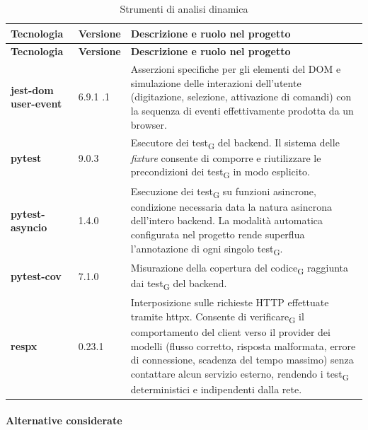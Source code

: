 \documentclass[a4paper, 10pt]{article}
\newenvironment{tabellatec}[2]{%
  \begingroup
  \small
  \setlength{\tabcolsep}{4pt}
  \begin{longtable}{|p{2.8cm}|p{1.5cm}|p{9.2cm}|}
    \caption{#1}\label{#2}\\
    \hline
    \textbf{Tecnologia} & \textbf{Versione} & \textbf{Descrizione e ruolo nel progetto} \\
    \hline
    \endfirsthead
    \hline
    \textbf{Tecnologia} & \textbf{Versione} & \textbf{Descrizione e ruolo nel progetto} \\
    \hline
    \endhead
}{%
  \end{longtable}
  \endgroup
}
\begin{document}
\begin{tabellatec}{Strumenti di analisi dinamica}{tab:tec-dinamica}
    \textbf{jest-dom \newline user-event} & 6.9.1 \newline 14.6.1 & Asserzioni specifiche per gli elementi del DOM e simulazione delle interazioni dell'utente (digitazione, selezione, attivazione di comandi) con la sequenza di eventi effettivamente prodotta da un browser. \\ \hline

    \textbf{pytest} & 9.0.3 & Esecutore dei test\textsubscript{G} del backend. Il sistema delle \textit{fixture} consente di comporre e riutilizzare le precondizioni dei test\textsubscript{G} in modo esplicito. \\ \hline

    \textbf{pytest-asyncio} & 1.4.0 & Esecuzione dei test\textsubscript{G} su funzioni asincrone, condizione necessaria data la natura asincrona dell'intero backend. La modalità automatica configurata nel progetto rende superflua l'annotazione di ogni singolo test\textsubscript{G}. \\ \hline

    \textbf{pytest-cov} & 7.1.0 & Misurazione della copertura del codice\textsubscript{G} raggiunta dai test\textsubscript{G} del backend. \\ \hline

    \textbf{respx} & 0.23.1 & Interposizione sulle richieste HTTP effettuate tramite httpx. Consente di verificare\textsubscript{G} il comportamento del client verso il provider dei modelli (flusso corretto, risposta malformata, errore di connessione, scadenza del tempo massimo) senza contattare alcun servizio esterno, rendendo i test\textsubscript{G} deterministici e indipendenti dalla rete. \\ \hline
\end{tabellatec}

\paragraph{Alternative considerate}\mbox{}
\end{document}
